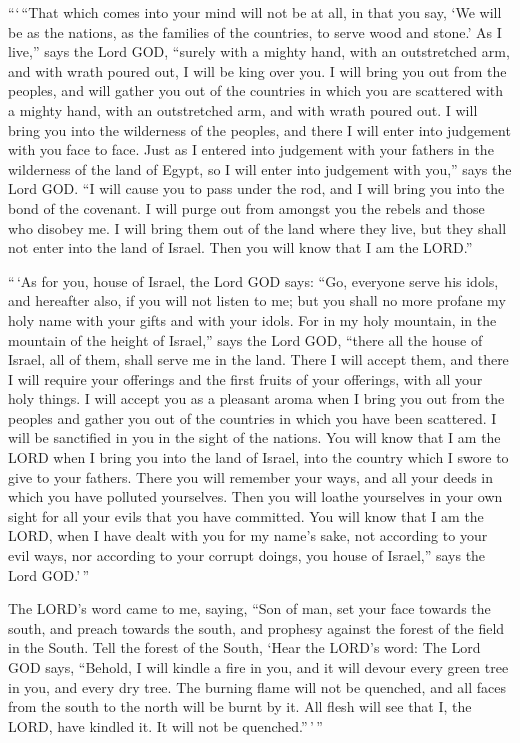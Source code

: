  ```\,``That which comes into your mind will not be at all,
in that you say, `We will be as the nations, as the families of the
countries, to serve wood and stone.'  As I live,'' says the
Lord GOD, ``surely with a mighty hand, with an outstretched arm, and
with wrath poured out, I will be king over you.  I will
bring you out from the peoples, and will gather you out of the countries
in which you are scattered with a mighty hand, with an outstretched arm,
and with wrath poured out.  I will bring you into the
wilderness of the peoples, and there I will enter into judgement with
you face to face.  Just as I entered into judgement with
your fathers in the wilderness of the land of Egypt, so I will enter
into judgement with you,'' says the Lord GOD.  ``I will
cause you to pass under the rod, and I will bring you into the bond of
the covenant.  I will purge out from amongst you the rebels
and those who disobey me. I will bring them out of the land where they
live, but they shall not enter into the land of Israel. Then you will
know that I am the LORD.''

 ``\,`As for you, house of Israel, the Lord GOD says: ``Go,
everyone serve his idols, and hereafter also, if you will not listen to
me; but you shall no more profane my holy name with your gifts and with
your idols.  For in my holy mountain, in the mountain of
the height of Israel,'' says the Lord GOD, ``there all the house of
Israel, all of them, shall serve me in the land. There I will accept
them, and there I will require your offerings and the first fruits of
your offerings, with all your holy things.  I will accept
you as a pleasant aroma when I bring you out from the peoples and gather
you out of the countries in which you have been scattered. I will be
sanctified in you in the sight of the nations.  You will
know that I am the LORD when I bring you into the land of Israel, into
the country which I swore to give to your fathers.  There
you will remember your ways, and all your deeds in which you have
polluted yourselves. Then you will loathe yourselves in your own sight
for all your evils that you have committed.  You will know
that I am the LORD, when I have dealt with you for my name's sake, not
according to your evil ways, nor according to your corrupt doings, you
house of Israel,'' says the Lord GOD.'\,''

 The LORD's word came to me, saying,  ``Son of
man, set your face towards the south, and preach towards the south, and
prophesy against the forest of the field in the South. 
Tell the forest of the South, `Hear the LORD's word: The Lord GOD says,
``Behold, I will kindle a fire in you, and it will devour every green
tree in you, and every dry tree. The burning flame will not be quenched,
and all faces from the south to the north will be burnt by it.
 All flesh will see that I, the LORD, have kindled it. It
will not be quenched.''\,'\,''

